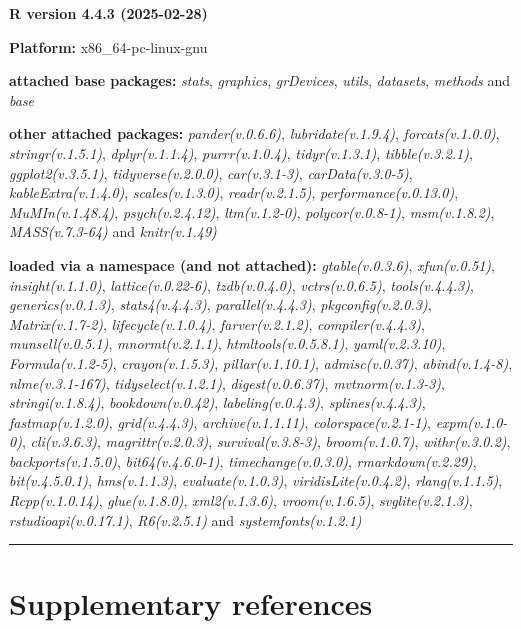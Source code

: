 \documentclass[
  bookmarksnumbered]{article}
\begin{document}
\textbf{R version 4.4.3 (2025-02-28)}

\textbf{Platform:} x86\_64-pc-linux-gnu

\textbf{attached base packages:}
\emph{stats}, \emph{graphics}, \emph{grDevices}, \emph{utils}, \emph{datasets}, \emph{methods} and \emph{base}

\textbf{other attached packages:}
\emph{pander(v.0.6.6)}, \emph{lubridate(v.1.9.4)}, \emph{forcats(v.1.0.0)}, \emph{stringr(v.1.5.1)}, \emph{dplyr(v.1.1.4)}, \emph{purrr(v.1.0.4)}, \emph{tidyr(v.1.3.1)}, \emph{tibble(v.3.2.1)}, \emph{ggplot2(v.3.5.1)}, \emph{tidyverse(v.2.0.0)}, \emph{car(v.3.1-3)}, \emph{carData(v.3.0-5)}, \emph{kableExtra(v.1.4.0)}, \emph{scales(v.1.3.0)}, \emph{readr(v.2.1.5)}, \emph{performance(v.0.13.0)}, \emph{MuMIn(v.1.48.4)}, \emph{psych(v.2.4.12)}, \emph{ltm(v.1.2-0)}, \emph{polycor(v.0.8-1)}, \emph{msm(v.1.8.2)}, \emph{MASS(v.7.3-64)} and \emph{knitr(v.1.49)}

\textbf{loaded via a namespace (and not attached):}
\emph{gtable(v.0.3.6)}, \emph{xfun(v.0.51)}, \emph{insight(v.1.1.0)}, \emph{lattice(v.0.22-6)}, \emph{tzdb(v.0.4.0)}, \emph{vctrs(v.0.6.5)}, \emph{tools(v.4.4.3)}, \emph{generics(v.0.1.3)}, \emph{stats4(v.4.4.3)}, \emph{parallel(v.4.4.3)}, \emph{pkgconfig(v.2.0.3)}, \emph{Matrix(v.1.7-2)}, \emph{lifecycle(v.1.0.4)}, \emph{farver(v.2.1.2)}, \emph{compiler(v.4.4.3)}, \emph{munsell(v.0.5.1)}, \emph{mnormt(v.2.1.1)}, \emph{htmltools(v.0.5.8.1)}, \emph{yaml(v.2.3.10)}, \emph{Formula(v.1.2-5)}, \emph{crayon(v.1.5.3)}, \emph{pillar(v.1.10.1)}, \emph{admisc(v.0.37)}, \emph{abind(v.1.4-8)}, \emph{nlme(v.3.1-167)}, \emph{tidyselect(v.1.2.1)}, \emph{digest(v.0.6.37)}, \emph{mvtnorm(v.1.3-3)}, \emph{stringi(v.1.8.4)}, \emph{bookdown(v.0.42)}, \emph{labeling(v.0.4.3)}, \emph{splines(v.4.4.3)}, \emph{fastmap(v.1.2.0)}, \emph{grid(v.4.4.3)}, \emph{archive(v.1.1.11)}, \emph{colorspace(v.2.1-1)}, \emph{expm(v.1.0-0)}, \emph{cli(v.3.6.3)}, \emph{magrittr(v.2.0.3)}, \emph{survival(v.3.8-3)}, \emph{broom(v.1.0.7)}, \emph{withr(v.3.0.2)}, \emph{backports(v.1.5.0)}, \emph{bit64(v.4.6.0-1)}, \emph{timechange(v.0.3.0)}, \emph{rmarkdown(v.2.29)}, \emph{bit(v.4.5.0.1)}, \emph{hms(v.1.1.3)}, \emph{evaluate(v.1.0.3)}, \emph{viridisLite(v.0.4.2)}, \emph{rlang(v.1.1.5)}, \emph{Rcpp(v.1.0.14)}, \emph{glue(v.1.8.0)}, \emph{xml2(v.1.3.6)}, \emph{vroom(v.1.6.5)}, \emph{svglite(v.2.1.3)}, \emph{rstudioapi(v.0.17.1)}, \emph{R6(v.2.5.1)} and \emph{systemfonts(v.1.2.1)}

\begin{center}\rule{0.5\linewidth}{0.5pt}\end{center}

\section{Supplementary references}\label{refs}

\begin{multicols}{2}
\AtNextBibliography{\footnotesize}
\printbibliography[heading=none]
\normalsize
\end{multicols}

\def\printbibliography{}

\printbibliography
\end{document}
